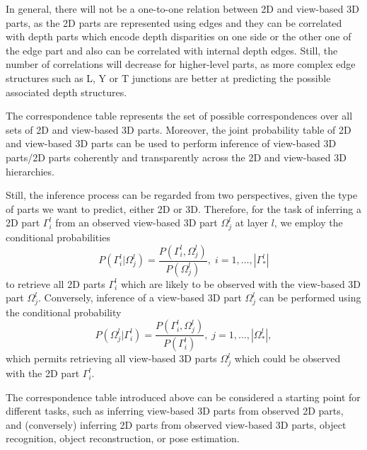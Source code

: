 \documentclass[conference]{IEEEtran}
\begin{document}
In general, there will not be a one-to-one relation between 2D and view-based 3D parts, as the 2D parts are represented using edges and they can be correlated with depth parts which encode depth disparities on one side or the other one of the edge part and also can be correlated with internal depth edges. Still, the number of correlations will decrease for higher-level parts, as more complex edge structures such as L, Y or T junctions are better at predicting the possible associated depth structures.

The correspondence table represents the set of possible correspondences over all sets of 2D and view-based 3D parts.  
Moreover, the joint probability table of 2D and view-based 3D parts can be used to perform inference of view-based 3D parts/2D parts coherently and transparently across the 2D and view-based 3D hierarchies.

Still, the inference process can be regarded from two perspectives, given the type of parts we want to predict, either 2D or 3D. Therefore, for the task of inferring a 2D part $\Gamma_i^l$ from an observed view-based 3D part $\Omega_j^l$ at layer $l$, we employ the conditional probabilities
\begin{equation}
P(\Gamma_i^l \vert \Omega_j^l)=\frac{P(\Gamma_i^l,\Omega_j^l)}{P(\Omega_j^l)}, \;i=1,\dots,|\Gamma_*^l|
\label{eqn:PGO.Bayes}
\end{equation}
to retrieve all 2D parts $\Gamma_i^l$ which are likely to be observed
with the view-based 3D part $\Omega_j^l$.  
Conversely, inference of a view-based 3D part $\Omega_j^l$ can be performed using the conditional probability
\begin{equation}
 P(\Omega_j^l \vert \Gamma_i^l)=\frac{P(\Gamma_i^l,\Omega_j^l)}{P(\Gamma_i^l)}, \;j=1,\dots,|\Omega_*^l|,
\end{equation} 
which permits retrieving all view-based 3D parts $\Omega_j^l$ which could be observed with the 2D part $\Gamma_i^l$. 
 
The correspondence table introduced above can be considered a starting point for different tasks, such as inferring view-based 3D parts from observed 2D parts, and (conversely) inferring 2D parts from observed view-based 3D parts, object recognition, object reconstruction, or pose estimation. 

\end{document}
